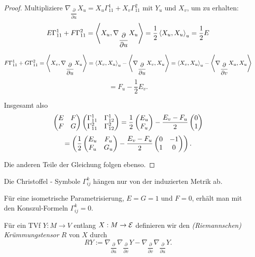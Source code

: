 \begin{proof}
	
	Multipliziere $ \nabla_{\dfrac{\partial}{\partial u}}X_u = X_u\Gamma_{11}^1 + X_v\Gamma_{11}^2 $ mit $ Y_u $ und $ X_v $, um zu erhalten:
		\[ E \Gamma_{11}^1 + F \Gamma_{11}^2 = \left \langle X_u, \nabla_{\dfrac{\partial}{\partial u}}X_u \right\rangle = \frac12 \left \langle X_u,X_u \right\rangle_u = \frac12 E \]
	
		\[ F\Gamma_{11}^1 + G \Gamma_{11}^2 = \left \langle X_v, \nabla_{\dfrac{\partial}{\partial u}}X_u \right\rangle = \left \langle X_v,X_u \right\rangle_u - \left \langle \nabla_{\dfrac{\partial}{\partial u}}X_v,X_u \right\rangle = \left \langle X_v,X_u \right\rangle_u - \left \langle \nabla_{\dfrac{\partial}{\partial v}}X_u,X_u \right\rangle \]
		\[ = F_u - \frac12 E_v. \]
	
	Insgesamt also
		\[ \begin{pmatrix} E &F \\F &G \end{pmatrix} \begin{pmatrix} \Gamma_{11}^1 & \Gamma_{12}^1 \\ \Gamma_{11}^2 & \Gamma_{12}^2 \end{pmatrix} = \frac12 \begin{pmatrix} E_u \\ F_u \end{pmatrix} - \dfrac{E_v - F_u}{2} \begin{pmatrix} 0 \\ 1 \end{pmatrix} \]
		\[ = \left( \frac12 \begin{pmatrix} E_u & F_u \\ F_u & G_u \end{pmatrix} - \dfrac{E_v - F_u}{2} \begin{pmatrix} 0 &-1 \\ 1 & 0  \end{pmatrix} \right).  \]
	
	Die anderen Teile der Gleichung  folgen ebenso.
	
\end{proof}

\begin{corollary}
	Die Christoffel - Symbole $ \Gamma_{ij}^k $ hängen nur von der induzierten Metrik ab.
\end{corollary}

\begin{example}
	
	Für eine isometrische Parametrisierung, $  E = G = 1 $ und $  F = 0 $, erhält man mit den Konszul-Formeln $ \Gamma_{ij}^k = 0 $.
	
\end{example}


\begin{definition}
	
	Für ein TVf $ Y : M \rightarrow V $ entlang $ X: M \rightarrow \mathcal E $ definieren wir den \emph{(Riemannschen) Krümmungstensor} $ R $ von $X$ durch 
		\[ RY := \nabla_{\dfrac{\partial}{\partial u}}\nabla_{\dfrac{\partial}{\partial v}}Y - \nabla_{\dfrac{\partial}{\partial v}}\nabla_{\dfrac{\partial}{\partial u}}Y. \]
	
\end{definition}

